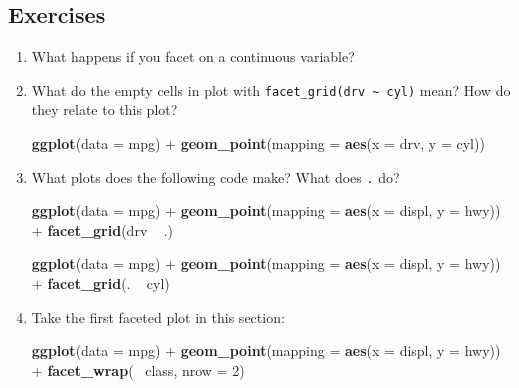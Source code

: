 \documentclass[]{book}
\newenvironment{Shaded}{\begin{snugshade}}{\end{snugshade}}
\newcommand{\KeywordTok}[1]{\textcolor[rgb]{0.13,0.29,0.53}{\textbf{{#1}}}}
\newcommand{\DataTypeTok}[1]{\textcolor[rgb]{0.13,0.29,0.53}{{#1}}}
\newcommand{\DecValTok}[1]{\textcolor[rgb]{0.00,0.00,0.81}{{#1}}}
\newcommand{\StringTok}[1]{\textcolor[rgb]{0.31,0.60,0.02}{{#1}}}
\newcommand{\NormalTok}[1]{{#1}}
\begin{document}
\subsection{Exercises}\label{exercises-2}

\begin{enumerate}
\def\labelenumi{\arabic{enumi}.}
\item
  What happens if you facet on a continuous variable?
\item
  What do the empty cells in plot with
  \texttt{facet\_grid(drv\ \textasciitilde{}\ cyl)} mean? How do they
  relate to this plot?

\begin{Shaded}
\begin{Highlighting}[]
\KeywordTok{ggplot}\NormalTok{(}\DataTypeTok{data =} \NormalTok{mpg) +}\StringTok{ }
\StringTok{  }\KeywordTok{geom_point}\NormalTok{(}\DataTypeTok{mapping =} \KeywordTok{aes}\NormalTok{(}\DataTypeTok{x =} \NormalTok{drv, }\DataTypeTok{y =} \NormalTok{cyl))}
\end{Highlighting}
\end{Shaded}
\item
  What plots does the following code make? What does \texttt{.} do?

\begin{Shaded}
\begin{Highlighting}[]
\KeywordTok{ggplot}\NormalTok{(}\DataTypeTok{data =} \NormalTok{mpg) +}\StringTok{ }
\StringTok{  }\KeywordTok{geom_point}\NormalTok{(}\DataTypeTok{mapping =} \KeywordTok{aes}\NormalTok{(}\DataTypeTok{x =} \NormalTok{displ, }\DataTypeTok{y =} \NormalTok{hwy)) +}
\StringTok{  }\KeywordTok{facet_grid}\NormalTok{(drv ~}\StringTok{ }\NormalTok{.)}

\KeywordTok{ggplot}\NormalTok{(}\DataTypeTok{data =} \NormalTok{mpg) +}\StringTok{ }
\StringTok{  }\KeywordTok{geom_point}\NormalTok{(}\DataTypeTok{mapping =} \KeywordTok{aes}\NormalTok{(}\DataTypeTok{x =} \NormalTok{displ, }\DataTypeTok{y =} \NormalTok{hwy)) +}
\StringTok{  }\KeywordTok{facet_grid}\NormalTok{(. ~}\StringTok{ }\NormalTok{cyl)}
\end{Highlighting}
\end{Shaded}
\item
  Take the first faceted plot in this section:

\begin{Shaded}
\begin{Highlighting}[]
\KeywordTok{ggplot}\NormalTok{(}\DataTypeTok{data =} \NormalTok{mpg) +}\StringTok{ }
\StringTok{  }\KeywordTok{geom_point}\NormalTok{(}\DataTypeTok{mapping =} \KeywordTok{aes}\NormalTok{(}\DataTypeTok{x =} \NormalTok{displ, }\DataTypeTok{y =} \NormalTok{hwy)) +}\StringTok{ }
\StringTok{  }\KeywordTok{facet_wrap}\NormalTok{(~}\StringTok{ }\NormalTok{class, }\DataTypeTok{nrow =} \DecValTok{2}\NormalTok{)}
\end{Highlighting}
\end{Shaded}


\end{enumerate}
\end{document}
